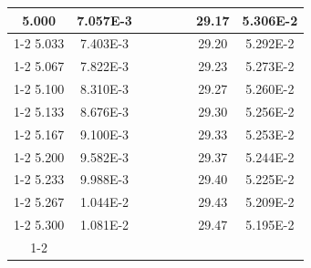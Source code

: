 \documentclass[article,12pt]{elsarticle}
\begin{document}
\begin{longtable}[c]{|c|c|cccccc}
5.000    & 7.057E-3  &                       &                              &                            & \multicolumn{1}{c|}{} & \multicolumn{1}{c|}{29.17}   & \multicolumn{1}{c|}{5.306E-2} \\ \cline{1-2} \cline{7-8} 
5.033    & 7.403E-3  &                       &                              &                            & \multicolumn{1}{c|}{} & \multicolumn{1}{c|}{29.20}   & \multicolumn{1}{c|}{5.292E-2} \\ \cline{1-2} \cline{7-8} 
5.067    & 7.822E-3  &                       &                              &                            & \multicolumn{1}{c|}{} & \multicolumn{1}{c|}{29.23}   & \multicolumn{1}{c|}{5.273E-2} \\ \cline{1-2} \cline{7-8} 
5.100    & 8.310E-3  &                       &                              &                            & \multicolumn{1}{c|}{} & \multicolumn{1}{c|}{29.27}   & \multicolumn{1}{c|}{5.260E-2} \\ \cline{1-2} \cline{7-8} 
5.133    & 8.676E-3  &                       &                              &                            & \multicolumn{1}{c|}{} & \multicolumn{1}{c|}{29.30}   & \multicolumn{1}{c|}{5.256E-2} \\ \cline{1-2} \cline{7-8} 
5.167    & 9.100E-3  &                       &                              &                            & \multicolumn{1}{c|}{} & \multicolumn{1}{c|}{29.33}   & \multicolumn{1}{c|}{5.253E-2} \\ \cline{1-2} \cline{7-8} 
5.200    & 9.582E-3  &                       &                              &                            & \multicolumn{1}{c|}{} & \multicolumn{1}{c|}{29.37}   & \multicolumn{1}{c|}{5.244E-2} \\ \cline{1-2} \cline{7-8} 
5.233    & 9.988E-3  &                       &                              &                            & \multicolumn{1}{c|}{} & \multicolumn{1}{c|}{29.40}   & \multicolumn{1}{c|}{5.225E-2} \\ \cline{1-2} \cline{7-8} 
5.267    & 1.044E-2  &                       &                              &                            & \multicolumn{1}{c|}{} & \multicolumn{1}{c|}{29.43}   & \multicolumn{1}{c|}{5.209E-2} \\ \cline{1-2} \cline{7-8} 
5.300    & 1.081E-2  &                       &                              &                            & \multicolumn{1}{c|}{} & \multicolumn{1}{c|}{29.47}   & \multicolumn{1}{c|}{5.195E-2} \\ \cline{1-2} \cline{7-8} 

\end{longtable}
\end{document}
